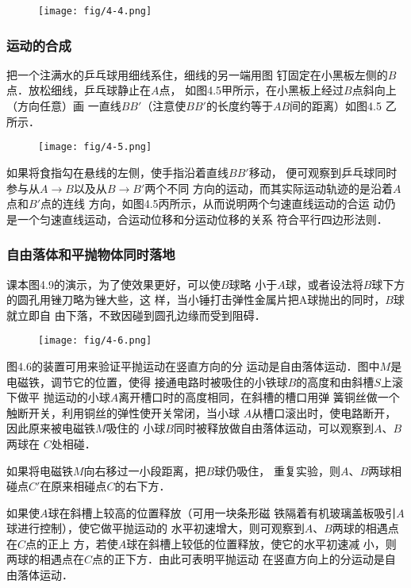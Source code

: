 \begin{figure}[htp]
    \centering
    \texttt{[image: fig/4-4.png]}
    \caption{}
\end{figure}

\subsubsection{运动的合成}
把一个注满水的乒乓球用细线系住，细线的另一端用图
钉固定在小黑板左侧的$B$点．放松细线，乒乓球静止在$A$点，
如图4.5甲所示，在小黑板上经过$B$点斜向上（方向任意）画
一直线$BB'$（注意使$BB'$的长度约等于$AB$间的距离）如图4.5
乙所示．
\begin{figure}[htp]
    \centering
    \texttt{[image: fig/4-5.png]}
    \caption{}
\end{figure}

如果将食指勾在悬线的左侧，使手指沿着直线$BB'$移动，
便可观察到乒乓球同时参与从$A\to B$以及从$B\to B'$两个不同
方向的运动，而其实际运动轨迹的是沿着$A$点和$B'$点的连线
方向，如图4.5丙所示，从而说明两个匀速直线运动的合运
动仍是一个匀速直线运动，合运动位移和分运动位移的关系
符合平行四边形法则．

\subsubsection{自由落体和平抛物体同时落地}
课本图4.9的演示，为了使效果更好，可以使$B$球略
小于$A$球，或者设法将$B$球下方的圆孔用锉刀略为锉大些，这
样，当小锤打击弹性金属片把A球抛出的同时，$B$球就立即自
由下落，不致因碰到圆孔边缘而受到阻碍．
\begin{figure}[htp]
    \centering
    \texttt{[image: fig/4-6.png]}
    \caption{}
\end{figure}

图4.6的装置可用来验证平抛运动在竖直方向的分
运动是自由落体运动．图中$M$是电磁铁，调节它的位置，使得
接通电路时被吸住的小铁球$B$的高度和由斜槽$S$上滚下做平
抛运动的小球$A$离开槽口时的高度相同，在斜槽的槽口用弹
簧铜丝做一个触断开关，利用铜丝的弹性使开关常闭，当小球
$A$从槽口滚出时，使电路断开，因此原来被电磁铁$M$吸住的
小球$B$同时被释放做自由落体运动，可以观察到$A$、$B$两球在
$C$处相碰．

如果将电磁铁$M$向右移过一小段距离，把$B$球仍吸住，
重复实验，则$A$、$B$两球相碰点$C'$在原来相碰点$C$的右下方．

如果使$A$球在斜槽上较高的位置释放（可用一块条形磁
铁隔着有机玻璃盖板吸引$A$球进行控制），使它做平抛运动的
水平初速增大，则可观察到$A$、$B$两球的相遇点在$C$点的正上
方，若使$A$球在斜槽上较低的位置释放，使它的水平初速减
小，则两球的相遇点在$C$点的正下方．由此可表明平抛运动
在竖直方向上的分运动是自由落体运动．

